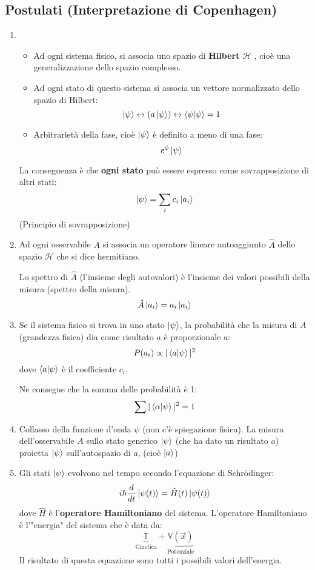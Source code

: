 \documentclass[a4paper]{article}
\begin{document}
\subsection{Postulati (Interpretazione di Copenhagen)}
\begin{enumerate}
  \item 
    \begin{itemize}
      \item 
        Ad ogni sistema fisico, si associa uno spazio di \textbf{Hilbert} \( \mathcal{H} \) , cioè una
        generalizzazione dello spazio complesso.
      \item 
        Ad ogni stato di questo sistema si associa un vettore normalizzato dello spazio di
        Hilbert:
        \[
          \ket{\psi} \leftrightarrow \left( a \ket{\psi } \right) \leftrightarrow \braket{\psi} = 1
        \] 
      \item Arbitrarietà della fase, cioè \( \ket{\psi} \) è definito a meno di una fase:
        \[
           e^\phi \ket{\psi}
        \]
    \end{itemize}
    La conseguenza è che \textbf{ogni stato} può essere espresso come sovrapposizione di
    altri stati:
    \[
      \ket{\psi} = \sum_i c_i \ket{a_i}
    \] 
    (Principio di sovrapposizione)

  \item Ad ogni osservabile \( A \) si associa un operatore lineare autoaggiunto \( \hat{A} \)
    dello spazio \( \mathcal{H} \)  che si dice hermitiano.

    Lo spettro di \( \hat{A} \) (l'insieme degli autovalori) è l'insieme dei valori
    possibili della misura (spettro della misura).
    \[
      \hat{A} \ket{a_i} = a_i \ket{a_i}
    \] 

  \item Se il sistema fisico si trova in uno stato \( \ket{\psi } \), la probabilità che
    la misura di \( A \) (grandezza fisica) dia come risultato \( a \) è proporzionale a:
    \[
      P(a_i) \propto |\braket{a}{\psi}|^2
    \] 
    dove \( \braket{a}{\psi} \) è il coefficiente \( c_i \).

    Ne consegue che la somma delle probabilità è 1:
    \[
      \sum |\braket{\alpha}{\psi}|^2 = 1
    \] 

  \item Collasso della funzione d'onda \( \psi  \) (non c'è spiegazione fisica).
    La misura dell'osservabile \( A \) sullo stato generico \( \ket{\psi } \) (che ha dato
    un risultato \( a \)) proietta \( \ket{\psi } \) sull'autospazio di \( a \), (cioè \( \ket{a} \))

  \item Gli stati \( \ket{\psi } \) evolvono nel tempo secondo l'equazione di Schrödinger:
    \[
      i \hslash \frac{d}{dt} \ket{\psi(t) } = \hat{H}(t) \ket{\psi(t) }
    \] 
    dove \( \hat{H} \) è l'\textbf{operatore Hamiltoniano} del sistema.
    L'operatore Hamiltoniano è l'"energia" del sistema che è data da:
    \[
      \underbrace{\mathbb{T}}_{\text{Cinetica}} + \underbrace{\mathbb{V}(\vec{x})}_{\text{Potenziale}}
    \] 
    Il risultato di questa equazione sono tutti i possibili valori dell'energia.
\end{enumerate}
\end{document}
